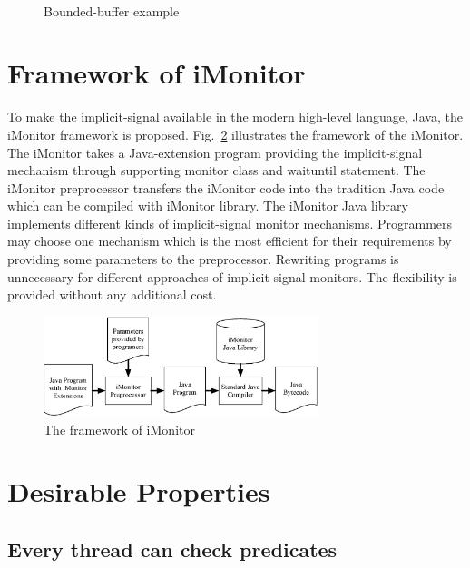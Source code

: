 \documentclass[10pt, conference, compsocconf]{IEEEtran}
\begin{document}
\begin{figure}
  \centering
  \\
  \caption{Bounded-buffer example}
  \label{fig:bb_exp}
\end{figure}


\section{Framework of iMonitor} \label{sec:fw}
To make the implicit-signal available in the modern high-level language, Java, 
the iMonitor framework is proposed. Fig.~\ref{fig:framework} illustrates the 
framework of the iMonitor. The iMonitor takes a Java-extension program providing
the implicit-signal mechanism through supporting monitor class and waituntil 
statement. The iMonitor preprocessor transfers the iMonitor code into the 
tradition Java code which can be compiled with iMonitor library. The iMonitor 
Java library implements different kinds of implicit-signal monitor mechanisms. 
Programmers may choose one mechanism which is the most efficient for their 
requirements by providing some parameters to the preprocessor. Rewriting 
programs is unnecessary for different approaches of implicit-signal monitors. 
The flexibility is provided without any additional cost. 

\begin{figure}[ht!]
  \centering
  \includegraphics[width=80mm]{fig/flow.eps}
  \caption{The framework of iMonitor}
  \label{fig:framework}
\end{figure}

\section{Desirable Properties}
\subsection{Every thread can check predicates}
\end{document}
